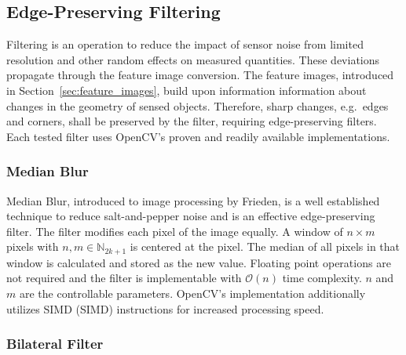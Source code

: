 \subsection{Edge-Preserving Filtering}

Filtering is an operation to reduce the impact of sensor noise from limited resolution and other random effects on measured quantities.
These deviations propagate through the feature image conversion.
The feature images, introduced in Section~\ref{sec:feature_images}, build upon information information about changes in the geometry of sensed objects.
Therefore, sharp changes, e.g.~edges and corners, shall be preserved by the filter, requiring edge-preserving filters.
Each tested filter uses OpenCV's\cite{opencv_library} proven and readily available implementations.

\subsubsection{Median Blur}

Median Blur, introduced to image processing by Frieden\cite{frieden_new76}, is a well established technique to reduce salt-and-pepper noise and is an effective edge-preserving filter.
The filter modifies each pixel of the image equally.
A window of $n \times m$ pixels with $n,m \in \mathbb{N}_{2k + 1}$ is centered at the pixel.
The median of all pixels in that window is calculated and stored as the new value.
Floating point operations are not required and the filter is implementable with $\mathcal{O}(n)$\cite{huang_ieee79} time complexity.
$n$ and $m$ are the controllable parameters.
OpenCV's\cite{opencv_library} implementation additionally utilizes \acrshort{SIMD} (\acrlong{SIMD}) instructions for increased processing speed.

\subsubsection{Bilateral Filter}

